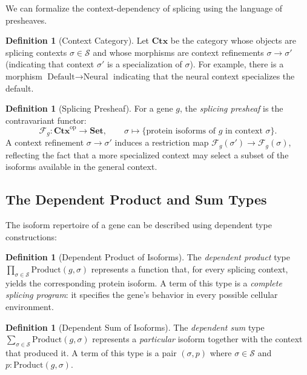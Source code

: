 \documentclass[12pt,a4paper]{article}
\theoremstyle{definition}
\newtheorem{definition}[theorem]{Definition}
\newcommand{\cat}[1]{\mathbf{#1}}
\begin{document}
We can formalize the context-dependency of splicing using the language of presheaves.

\begin{definition}[Context Category]\label{def:context-category}
Let $\cat{Ctx}$ be the category whose objects are splicing contexts $\sigma \in \mathcal{S}$ and whose morphisms are context refinements $\sigma \to \sigma'$ (indicating that context $\sigma'$ is a specialization of $\sigma$). For example, there is a morphism $\text{Default} \to \text{Neural}$ indicating that the neural context specializes the default.
\end{definition}

\begin{definition}[Splicing Presheaf]\label{def:splicing-presheaf}
For a gene $g$, the \emph{splicing presheaf} is the contravariant functor:
\[
  \mathcal{F}_g \colon \cat{Ctx}^{\mathrm{op}} \to \cat{Set},
  \qquad
  \sigma \mapsto \{\text{protein isoforms of } g \text{ in context } \sigma\}.
\]
A context refinement $\sigma \to \sigma'$ induces a restriction map $\mathcal{F}_g(\sigma') \to \mathcal{F}_g(\sigma)$, reflecting the fact that a more specialized context may select a subset of the isoforms available in the general context.
\end{definition}

\subsection{The Dependent Product and Sum Types}

The isoform repertoire of a gene can be described using dependent type constructions:

\begin{definition}[Dependent Product of Isoforms]\label{def:dependent-product}
The \emph{dependent product} type $\prod_{\sigma \in \mathcal{S}} \text{Product}(g, \sigma)$ represents a function that, for every splicing context, yields the corresponding protein isoform. A term of this type is a \emph{complete splicing program}: it specifies the gene's behavior in every possible cellular environment.
\end{definition}

\begin{definition}[Dependent Sum of Isoforms]\label{def:dependent-sum}
The \emph{dependent sum} type $\sum_{\sigma \in \mathcal{S}} \text{Product}(g, \sigma)$ represents a \emph{particular} isoform together with the context that produced it. A term of this type is a pair $(\sigma, p)$ where $\sigma \in \mathcal{S}$ and $p : \text{Product}(g, \sigma)$.
\end{definition}
\end{document}
